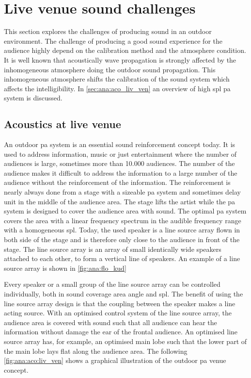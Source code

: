 \section{Live venue sound challenges}
This section explores the challenges of producing sound in an outdoor environment. The challenge of producing a good sound experience for the audience highly depend on the calibration method and the atmosphere condition. It is well known that acoustically wave propagation is strongly affected by the inhomogeneous atmosphere doing the outdoor sound propagation. This inhomogeneous atmosphere shifts the calibration of the sound system which affects the intelligibility. In \autoref{sec:ana:aco_liv_ven} an overview of high \gls{spl} \gls{pa} system is discussed.



\subsection{Acoustics at live venue}\label{sec:ana:aco_liv_ven}
An outdoor \gls{pa} system is an essential sound reinforcement concept today. It is used to address information, music or just entertainment where the number of audiences is large, sometimes more than 10.000 audiences. The number of the audience makes it difficult to address the information to a large number of the audience without the reinforcement of the information. The reinforcement is nearly always done from a stage with a sizeable \gls{pa} system and sometimes delay unit in the middle of the audience area. The stage lifts the artist while the \gls{pa} system is designed to cover the audience area with sound. The optimal \gls{pa} system covers the area with a linear frequency spectrum in the audible frequency range with a homogeneous \gls{spl}. Today, the used speaker is a line source array flown in both side of the stage and is therefore only close to the audience in front of the stage. The line source array is an array of small identically wide speakers attached to each other, to form a vertical line of speakers. An example of a line source array is shown in \autoref{fig:ana:flo_kud}


Every speaker or a small group of the line source array can be controlled individually, both in sound coverage area angle and \gls{spl}. The benefit of using the line source array design is that the coupling between the speaker makes a line acting source. With an optimised control system of the line source array, the audience area is covered with sound such that all audience can hear the information without damage the ear of the frontal audience. An optimised line source array has, for example, an optimised main lobe such that the lower part of the main lobe lays flat along the audience area.
The following \autoref{fig:ana:aco:liv_ven} shows a graphical illustration of the outdoor \gls{pa} venue concept.

